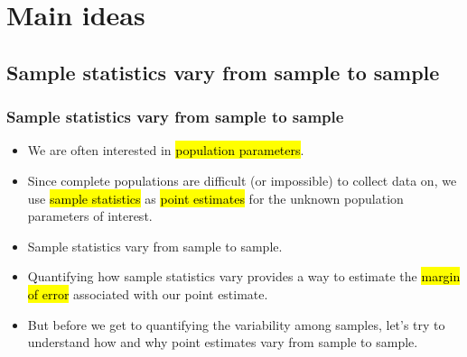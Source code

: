 \documentclass[slidestop,compress,mathserif,12pt,t,professionalfonts,xcolor=table]{beamer}
\begin{document}

\section{Main ideas}


\subsection{Sample statistics vary from sample to sample}
\label{mi1}


\begin{frame}
\frametitle{Sample statistics vary from sample to sample}

\begin{itemize}

\item We are often interested in \hl{population parameters}.

\item Since complete populations are difficult (or impossible) to collect data on, we use \hl{sample statistics} as \hl{point estimates} for the unknown population parameters of interest.

\item Sample statistics vary from sample to sample.

\item Quantifying how sample statistics vary provides a way to estimate the \hl{margin of error} associated with our point estimate.

\item But before we get to quantifying the variability among samples, let's try to understand how and why point estimates vary from sample to sample.

\end{itemize}




\end{frame}
\end{document}
